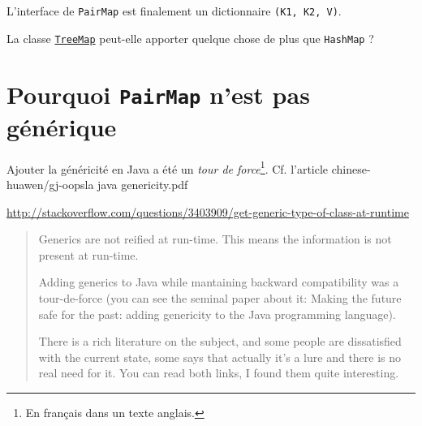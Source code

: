 L'interface de \texttt{PairMap} est finalement un dictionnaire \texttt{(K1, K2, V)}.

La classe \href{http://download.java.net/jdk8u20/docs/api/java/util/TreeMap.html}{\texttt{TreeMap}} peut-elle apporter quelque chose de plus que \texttt{HashMap} ?

\section{Pourquoi \texttt{PairMap} n'est pas générique}

Ajouter la généricité en Java a été un \textsl{tour de force}\footnote{En français dans un texte anglais.}. Cf. l'article chinese-huawen/gj-oopsla java genericity.pdf

\url{http://stackoverflow.com/questions/3403909/get-generic-type-of-class-at-runtime}
\begin{quote}

Generics are not reified at run-time. This means the information is not present at run-time.

Adding generics to Java while mantaining backward compatibility was a tour-de-force (you can see the seminal paper about it: Making the future safe for the past: adding genericity to the Java programming language).

There is a rich literature on the subject, and some people are dissatisfied with the current state, some says that actually it's a lure and there is no real need for it. You can read both links, I found them quite interesting.\end{quote}

